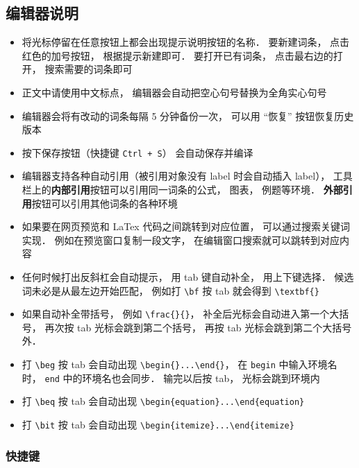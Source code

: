 \subsection{编辑器说明}
\begin{itemize}
\item 将光标停留在任意按钮上都会出现提示说明按钮的名称． 要新建词条， 点击红色的加号按钮， 根据提示新建即可． 要打开已有词条， 点击最右边的打开， 搜索需要的词条即可
\item 正文中请使用中文标点， 编辑器会自动把空心句号替换为全角实心句号
\item 编辑器会将有改动的词条每隔 5 分钟备份一次， 可以用 “恢复” 按钮恢复历史版本
\item 按下保存按钮（快捷键 \lstinline|Ctrl + S|） 会自动保存并编译
\item 编辑器支持各种自动引用（被引用对象没有 label 时会自动插入 label）， 工具栏上的\textbf{内部引用}按钮可以引用同一词条的公式， 图表， 例题等环境． \textbf{外部引用}按钮可以引用其他词条的各种环境
\item 如果要在网页预览和 LaTex 代码之间跳转到对应位置， 可以通过搜索关键词实现． 例如在预览窗口复制一段文字， 在编辑窗口搜索就可以跳转到对应内容
\item 任何时候打出反斜杠会自动提示， 用 tab 键自动补全， 用上下键选择． 候选词未必是从最左边开始匹配， 例如打 \lstinline|\bf| 按 tab 就会得到 \lstinline|\textbf{}|
\item 如果自动补全带括号， 例如 \lstinline|\frac{}{}|， 补全后光标会自动进入第一个大括号， 再次按 tab 光标会跳到第二个括号， 再按 tab 光标会跳到第二个大括号外．
\item 打 \lstinline|\beg| 按 tab 会自动出现 \lstinline|\begin{}...\end{}|， 在 \lstinline|begin| 中输入环境名时， \lstinline|end| 中的环境名也会同步． 输完以后按 tab， 光标会跳到环境内
\item 打 \lstinline|\beq| 按 tab 会自动出现 \lstinline|\begin{equation}...\end{equation}|
\item 打 \lstinline|\bit| 按 tab 会自动出现 \lstinline|\begin{itemize}...\end{itemize}|
\end{itemize}


\subsubsection{快捷键}


